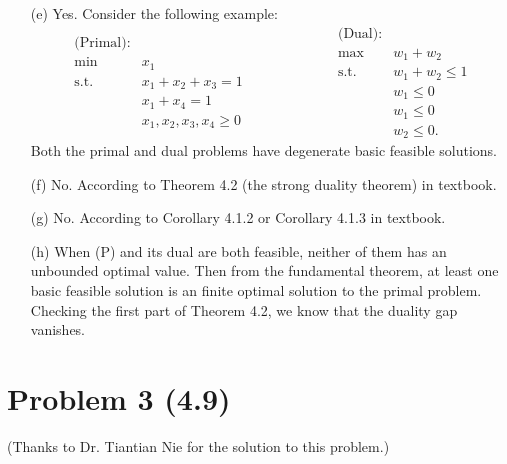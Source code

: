 \documentclass[12pt]{article}
\begin{document}
\begin{itemize}
\item[(e)] Yes. Consider the following example:
\begin{equation*}
\begin{array}{rl}
\text{(Primal):} & \\
\min & x_1 \\\text{s.t.} & x_1 + x_2 +x_3=1 \\
& x_1+x_4=1\\
& x_1, x_2, x_3, x_4 \geq 0
\end{array} \qquad \qquad \qquad
\begin{array}{rl}
\text{(Dual):} & \\
\max & w_1+w_2 \\
\text{s.t.} & w_1+w_2\leq 1 \\ & w_1\leq 0 \\ & w_1\leq 0\\ & w_2\leq 0.
\end{array}
\end{equation*}
Both the primal and dual problems have degenerate basic feasible solutions. 

\item[(f)] No. According to Theorem 4.2 (the strong duality theorem) in textbook.
\item[(g)] No. According to Corollary 4.1.2 or Corollary 4.1.3 in textbook.
\item[(h)] When (P) and its dual are both feasible, neither of them has an unbounded optimal value. Then from the fundamental theorem, at least one basic feasible solution is an finite optimal solution to the primal problem. Checking the first part of Theorem 4.2, we know that the duality gap vanishes. 
\end{itemize}

\section*{Problem 3 (4.9)}


(Thanks to Dr. Tiantian Nie for the solution to this problem.)
\end{document}
